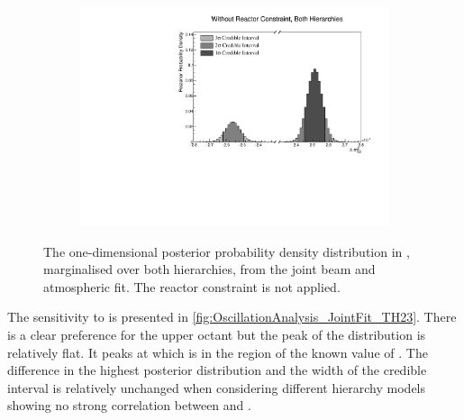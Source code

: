 \begin{figure}[h]
  \begin{subfigure}[t]{0.98\textwidth}
    \includegraphics[width=\textwidth, trim={0mm 0mm 0mm 0mm}, clip,page=1]{Figures/OA/JointFit/Contours_1D_dm32_BH_1_woRC_UnSmeared_CredibleInterval.pdf}
  \end{subfigure}
  \caption{The one-dimensional posterior probability density distribution in , marginalised over both hierarchies, from the joint beam and atmospheric fit. The reactor constraint is not applied.}
  \label{fig:OscillationAnalysis_JointFit_DELM32}
\end{figure}

The sensitivity to  is presented in \autoref{fig:OscillationAnalysis_JointFit_TH23}. There is a clear preference for the upper octant but the peak of the distribution is relatively flat. It peaks at  which is in the region of the known value of . The difference in the highest posterior distribution and the width of the credible interval is relatively unchanged when considering different hierarchy models showing no strong correlation between  and .

